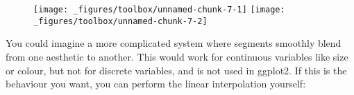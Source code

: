 \begin{Shaded}
\begin{Highlighting}[]
\StringTok{ }\NormalTok{(} \OperatorTok{:}\NormalTok{, } \OperatorTok{:}\NormalTok{, } \NormalTok{(}\NormalTok{,}\NormalTok{,}\NormalTok{))}

 \OperatorTok{+}\StringTok{ }
\StringTok{  }\NormalTok{(}\NormalTok{(} \NormalTok{), } \NormalTok{) }\OperatorTok{+}
\StringTok{  }\NormalTok{(} \NormalTok{)}

\OperatorTok{+}\StringTok{ }
\StringTok{  }\NormalTok{(}\NormalTok{(} \NormalTok{), } \NormalTok{) }\OperatorTok{+}
\StringTok{  }\NormalTok{(} \NormalTok{)}
\end{Highlighting}
\end{Shaded}

\begin{figure}[H]
  \texttt{[image: \_figures/toolbox/unnamed-chunk-7-1]}%
  \texttt{[image: \_figures/toolbox/unnamed-chunk-7-2]}
\end{figure}

You could imagine a more complicated system where segments smoothly
blend from one aesthetic to another. This would work for continuous
variables like size or colour, but not for discrete variables, and is
not used in ggplot2. If this is the behaviour you want, you can perform
the linear interpolation yourself:

